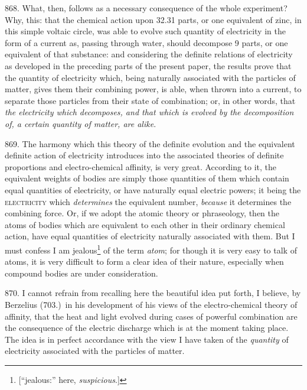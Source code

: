 868. What, then, follows as a necessary consequence of the whole
experiment? Why, this: that the chemical action upon 32.31 parts, or one
equivalent of zinc, in this simple voltaic circle, was able to evolve
such quantity of electricity in the form of a current as, passing
through water, should decompose 9 parts, or one equivalent of that
substance: and considering the definite relations of electricity as
developed in the preceding parts of the present paper, the results prove
that the quantity of electricity which, being naturally associated with
the particles of matter, gives them their combining power, is able, when
thrown into a current, to separate those particles from their state of
combination; or, in other words, that \emph{the electricity which
decomposes, and that which is evolved by the de\-com\-po\-si\-tion of, a certain
quantity of matter, are alike}.

869. The harmony which this theory of the definite evolution and the
equivalent definite action of electricity introduces into the associated
theories of definite pro\-por\-tions and electro-chemical affinity, is very
great. According to it, the equivalent weights of bodies are simply
those quantities of them which contain equal quantities of electricity,
or have naturally equal electric powers; it being the
\textsc{electricity} which \emph{determines} the equivalent number,
\emph{because} it determines the combining force. Or, if we adopt the
atomic theory or phraseology, then the atoms of bodies which are
equivalent to each other in their ordinary chemical action, have equal
quantities of electricity naturally associated with them. But I must
confess I am jealous\footnote{{[}``jealous:'' here,
  \emph{suspicious}.{]}} of the term \emph{atom}; for though it is very
easy to talk of atoms, it is very difficult to form a clear idea of
their nature, especially when compound bodies are under consideration.

870. I cannot refrain from recalling here the beautiful idea put forth,
I believe, by Berzelius (703.)\ in his development of his views of the
electro-chemical theory of affinity, that the heat and light evolved
during cases of powerful combination are the consequence of the electric
discharge which is at the moment taking place. The idea is in perfect
accordance with the view I have taken of the \emph{quantity} of
electricity associated with the particles of matter.

